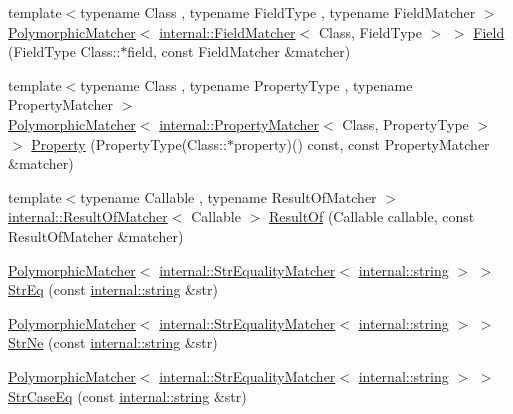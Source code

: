 \begin{DoxyCompactItemize}
\item 
{\footnotesize template$<$typename Class , typename Field\+Type , typename Field\+Matcher $>$ }\\\hyperlink{classtesting_1_1_polymorphic_matcher}{Polymorphic\+Matcher}$<$ \hyperlink{classtesting_1_1internal_1_1_field_matcher}{internal\+::\+Field\+Matcher}$<$ Class, Field\+Type $>$ $>$ \hyperlink{namespacetesting_a4df3849391696aa93ac3a7703a717c2a}{Field} (Field\+Type Class\+::$\ast$field, const Field\+Matcher \&matcher)
\item 
{\footnotesize template$<$typename Class , typename Property\+Type , typename Property\+Matcher $>$ }\\\hyperlink{classtesting_1_1_polymorphic_matcher}{Polymorphic\+Matcher}$<$ \hyperlink{classtesting_1_1internal_1_1_property_matcher}{internal\+::\+Property\+Matcher}$<$ Class, Property\+Type $>$ $>$ \hyperlink{namespacetesting_a0fad10571e23f7bc0d5c83d4c31ba740}{Property} (Property\+Type(Class\+::$\ast$property)() const, const Property\+Matcher \&matcher)
\item 
{\footnotesize template$<$typename Callable , typename Result\+Of\+Matcher $>$ }\\\hyperlink{classtesting_1_1internal_1_1_result_of_matcher}{internal\+::\+Result\+Of\+Matcher}$<$ Callable $>$ \hyperlink{namespacetesting_aaadb51dd383baa95f123ab891d4f8a5f}{Result\+Of} (Callable callable, const Result\+Of\+Matcher \&matcher)
\item 
\hyperlink{classtesting_1_1_polymorphic_matcher}{Polymorphic\+Matcher}$<$ \hyperlink{classtesting_1_1internal_1_1_str_equality_matcher}{internal\+::\+Str\+Equality\+Matcher}$<$ \hyperlink{namespacetesting_1_1internal_a8e8ff5b11e64078831112677156cb111}{internal\+::string} $>$ $>$ \hyperlink{namespacetesting_a154de81376ae7d584c6e5a619b45fb09}{Str\+Eq} (const \hyperlink{namespacetesting_1_1internal_a8e8ff5b11e64078831112677156cb111}{internal\+::string} \&str)
\item 
\hyperlink{classtesting_1_1_polymorphic_matcher}{Polymorphic\+Matcher}$<$ \hyperlink{classtesting_1_1internal_1_1_str_equality_matcher}{internal\+::\+Str\+Equality\+Matcher}$<$ \hyperlink{namespacetesting_1_1internal_a8e8ff5b11e64078831112677156cb111}{internal\+::string} $>$ $>$ \hyperlink{namespacetesting_a6f6b8af3d19cb969df0eb995c47a14d2}{Str\+Ne} (const \hyperlink{namespacetesting_1_1internal_a8e8ff5b11e64078831112677156cb111}{internal\+::string} \&str)
\item 
\hyperlink{classtesting_1_1_polymorphic_matcher}{Polymorphic\+Matcher}$<$ \hyperlink{classtesting_1_1internal_1_1_str_equality_matcher}{internal\+::\+Str\+Equality\+Matcher}$<$ \hyperlink{namespacetesting_1_1internal_a8e8ff5b11e64078831112677156cb111}{internal\+::string} $>$ $>$ \hyperlink{namespacetesting_addbdb8c0902ab09cade24fa6db7c0073}{Str\+Case\+Eq} (const \hyperlink{namespacetesting_1_1internal_a8e8ff5b11e64078831112677156cb111}{internal\+::string} \&str)

\end{DoxyCompactItemize}
